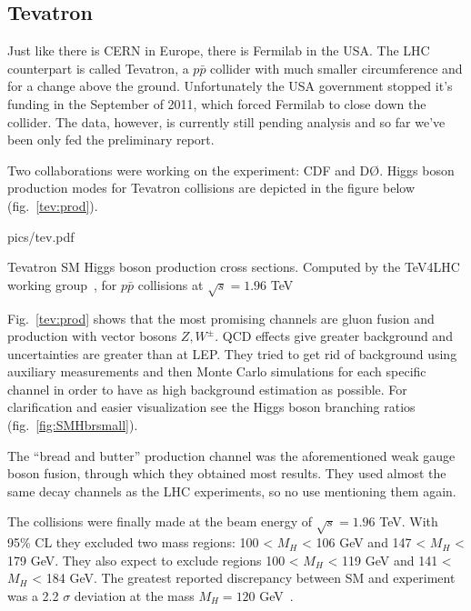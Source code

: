 \subsection{Tevatron}

Just like there is CERN in Europe, there is Fermilab in the USA. The LHC counterpart is called Tevatron, a $p\bar{p}$ collider with
much smaller circumference and for a change above the ground. Unfortunately the USA government stopped it's funding in the September of 2011, which
forced Fermilab to close down the collider. The data, however, is currently still pending analysis and so far we've been only fed the preliminary
report.

Two collaborations were working on the experiment: CDF and D\O. Higgs boson production modes for Tevatron collisions are depicted
in the figure below (fig.~\ref{tev:prod}).

\begin{myfig}[11cm]{pics/tev.pdf}
	\vspace{-12pt}
	\caption{Tevatron SM Higgs boson production cross sections. Computed by the TeV4LHC working group~\cite{tev4lhc}, for $p\bar{p}$
		collisions at $\sqrt{s} = 1.96$ TeV}
	\label{tev:prod}
\end{myfig}

Fig.~\ref{tev:prod} shows that the most promising channels are gluon fusion and production with vector bosons $Z,W^\pm$. QCD effects
give greater background and uncertainties are greater than at LEP. They tried to get rid of background using auxiliary measurements
and then Monte Carlo simulations for each specific channel in order to have as high background estimation as possible. For clarification
and easier visualization see the Higgs boson branching ratios (fig.~\ref{fig:SMHbrsmall}).

The ``bread and butter'' production channel was the aforementioned weak gauge boson fusion, through which they obtained most results.
They used almost the same decay channels as the LHC experiments, so no use mentioning them again.

The collisions  were finally made at the beam energy of $\sqrt{s} = 1.96$ TeV. With 95\% CL they excluded two mass regions: 100 < $M_H$ < 106 GeV
and 147 < $M_H$ < 179 GeV. They also expect to exclude regions 100 < $M_H$ < 119 GeV and 141 < $M_H$ < 184 GeV. The greatest reported
discrepancy between SM and experiment was a 2.2 $\sigma$ deviation at the mass $M_H = 120$ GeV~\cite{tev:review}.
